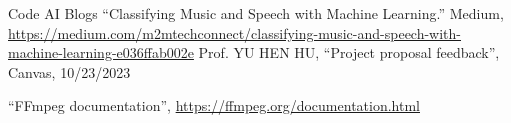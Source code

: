 \documentclass{article}
\begin{document}
    \begin{thebibliography}{99}
            Code AI Blogs ``Classifying Music and Speech with Machine Learning.'' Medium, \url{https://medium.com/m2mtechconnect/classifying-music-and-speech-with-machine-learning-e036ffab002e}
            Prof. YU HEN HU, ``Project proposal feedback'', Canvas, 10/23/2023

            ``FFmpeg documentation'', \url{https://ffmpeg.org/documentation.html}
    \end{thebibliography}
\end{document}
